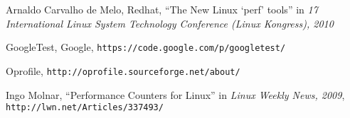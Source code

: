 \documentclass[final]{ols}
\begin{document}
\begin{thebibliography}{99}  %
Arnaldo Carvalho de Melo, Redhat, ``The New Linux `perf' tools'' in \emph{17 International Linux System Technology Conference (Linux Kongress), 2010}

GoogleTest, Google, \texttt{\small https://code.google.com/p/googletest/}

Oprofile, \texttt{\small \newline http://oprofile.sourceforge.net/about/}

Ingo Molnar, ``Performance Counters for Linux'' in \emph{Linux Weekly News, 2009}, \texttt{\small http://lwn.net/Articles/337493/}

\end{thebibliography}
\end{document}
